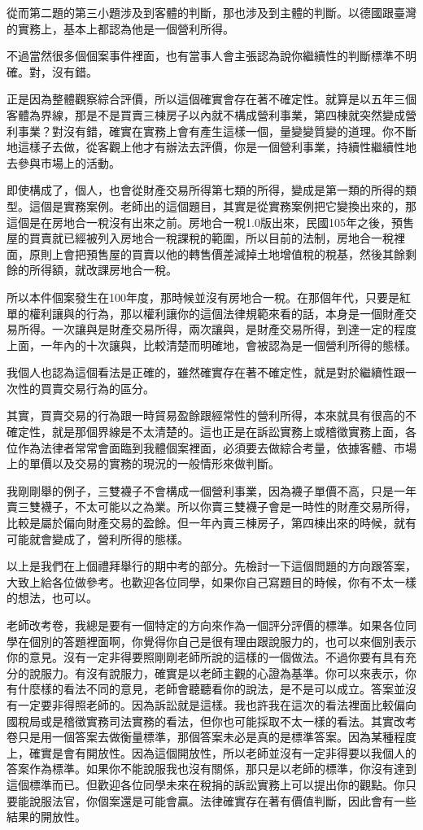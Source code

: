 \documentclass[]{ctexbook}
\begin{document}
從而第二題的第三小題涉及到客體的判斷，那也涉及到主體的判斷。以德國跟臺灣的實務上，基本上都認為他是一個營利所得。

不過當然很多個個案事件裡面，也有當事人會主張認為說你繼續性的判斷標準不明確。對，沒有錯。

正是因為整體觀察綜合評價，所以這個確實會存在著不確定性。就算是以五年三個客體為界線，那是不是買賣三棟房子以內就不構成營利事業，第四棟就突然變成營利事業？對沒有錯，確實在實務上會有產生這樣一個，量變變質變的道理。你不斷地這樣子去做，從客觀上他才有辦法去評價，你是一個營利事業，持續性繼續性地去參與市場上的活動。

即使構成了，個人，也會從財產交易所得第七類的所得，變成是第一類的所得的類型。這個是實務案例。老師出的這個題目，其實是從實務案例把它變換出來的，那這個是在房地合一稅沒有出來之前。房地合一稅1.0版出來，民國105年之後，預售屋的買賣就已經被列入房地合一稅課稅的範圍，所以目前的法制，房地合一稅裡面，原則上會把預售屋的買賣以他的轉售價差減掉土地增值稅的稅基，然後其餘剩餘的所得額，就改課房地合一稅。

所以本件個案發生在100年度，那時候並沒有房地合一稅。在那個年代，只要是紅單的權利讓與的行為，那以權利讓你的這個法律規範來看的話，本身是一個財產交易所得。一次讓與是財產交易所得，兩次讓與，是財產交易所得，到達一定的程度上面，一年內的十次讓與，比較清楚而明確地，會被認為是一個營利所得的態樣。

我個人也認為這個看法是正確的，雖然確實存在著不確定性，就是對於繼續性跟一次性的買賣交易行為的區分。

其實，買賣交易的行為跟一時貿易盈餘跟經常性的營利所得，本來就具有很高的不確定性，就是那個界線是不太清楚的。這也正是在訴訟實務上或稽徵實務上面，各位作為法律者常常會面臨到我體個案裡面，必須要去做綜合考量，依據客體、市場上的單價以及交易的實務的現況的一般情形來做判斷。

我剛剛舉的例子，三雙襪子不會構成一個營利事業，因為襪子單價不高，只是一年賣三雙襪子，不太可能以之為業。所以你賣三雙襪子會是一時性的財產交易所得，比較是屬於偏向財產交易的盈餘。但一年內賣三棟房子，第四棟出來的時候，就有可能就會變成了，營利所得的態樣。

以上是我們在上個禮拜舉行的期中考的部分。先檢討一下這個問題的方向跟答案，大致上給各位做參考。也歡迎各位同學，如果你自己寫題目的時候，你有不太一樣的想法，也可以。

老師改考卷，我總是要有一個特定的方向來作為一個評分評價的標準。如果各位同學在個別的答題裡面啊，你覺得你自己是很有理由跟說服力的，也可以來個別表示你的意見。沒有一定非得要照剛剛老師所說的這樣的一個做法。不過你要有具有充分的說服力。有沒有說服力，確實是以老師主觀的心證為基準。你可以來表示，你有什麼樣的看法不同的意見，老師會聽聽看你的說法，是不是可以成立。答案並沒有一定要非得照老師的。因為訴訟就是這樣。我也許我在這次的看法裡面比較偏向國稅局或是稽徵實務司法實務的看法，但你也可能採取不太一樣的看法。其實改考卷只是用一個答案去做衡量標準，那個答案未必是真的是標準答案。因為某種程度上，確實是會有開放性。因為這個開放性，所以老師並沒有一定非得要以我個人的答案作為標準。如果你不能說服我也沒有關係，那只是以老師的標準，你沒有達到這個標準而已。但歡迎各位同學未來在稅捐的訴訟實務上可以提出你的觀點。你只要能說服法官，你個案還是可能會贏。法律確實存在著有價值判斷，因此會有一些結果的開放性。
\end{document}
